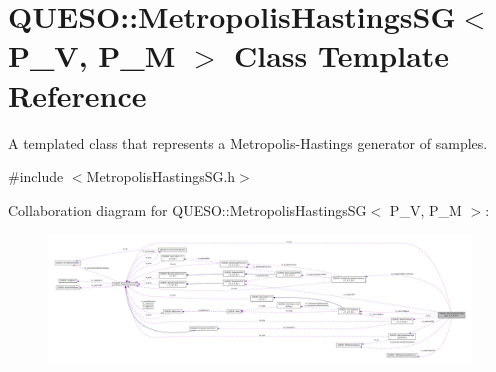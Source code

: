 \hypertarget{class_q_u_e_s_o_1_1_metropolis_hastings_s_g}{\section{Q\-U\-E\-S\-O\-:\-:Metropolis\-Hastings\-S\-G$<$ P\-\_\-\-V, P\-\_\-\-M $>$ Class Template Reference}
\label{class_q_u_e_s_o_1_1_metropolis_hastings_s_g}
}


A templated class that represents a Metropolis-\/\-Hastings generator of samples.  




{\ttfamily \#include $<$Metropolis\-Hastings\-S\-G.\-h$>$}



Collaboration diagram for Q\-U\-E\-S\-O\-:\-:Metropolis\-Hastings\-S\-G$<$ P\-\_\-\-V, P\-\_\-\-M $>$\-:
\nopagebreak
\begin{figure}[H]
\begin{center}
\leavevmode
\includegraphics[width=350pt]{class_q_u_e_s_o_1_1_metropolis_hastings_s_g__coll__graph}
\end{center}
\end{figure}
